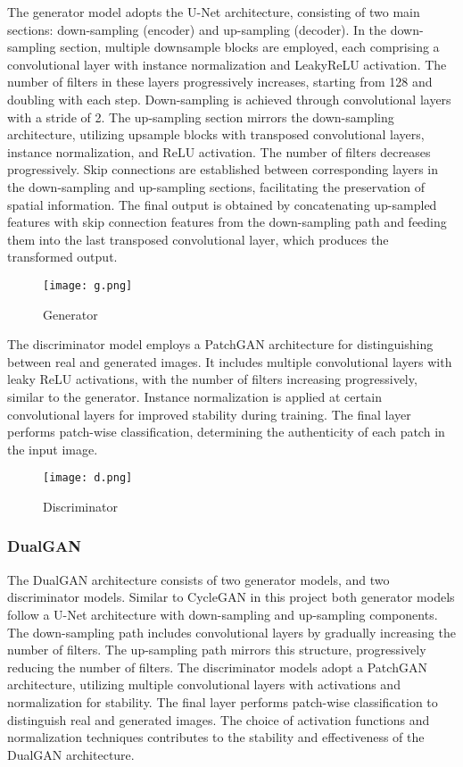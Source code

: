 \documentclass[conference]{IEEEtran}
\begin{document}
The generator model adopts the U-Net architecture, consisting of two main sections: down-sampling (encoder) and up-sampling (decoder). In the down-sampling section, multiple downsample blocks are employed, each comprising a convolutional layer with instance normalization and LeakyReLU activation. The number of filters in these layers progressively increases, starting from 128 and doubling with each step. Down-sampling is achieved through convolutional layers with a stride of 2. The up-sampling section mirrors the down-sampling architecture, utilizing upsample blocks with transposed convolutional layers, instance normalization, and ReLU activation. The number of filters decreases progressively. Skip connections are established between corresponding layers in the down-sampling and up-sampling sections, facilitating the preservation of spatial information. The final output is obtained by concatenating up-sampled features with skip connection features from the down-sampling path and feeding them into the last transposed convolutional layer, which produces the transformed output.

\begin{figure}[!ht]
  \centering
  \texttt{[image: g.png]}
  \captionsetup{justification=centering}
  \caption{Generator}
  \label{fig:Generator}
\end{figure}

The discriminator model employs a PatchGAN architecture for distinguishing between real and generated images. It includes multiple convolutional layers with leaky ReLU activations, with the number of filters increasing progressively, similar to the generator. Instance normalization is applied at certain convolutional layers for improved stability during training. The final layer performs patch-wise classification, determining the authenticity of each patch in the input image.

\begin{figure}[!ht]
  \centering
  \texttt{[image: d.png]}
  \captionsetup{justification=centering}
  \caption{Discriminator}
  \label{fig:Discriminator}
\end{figure}

\subsubsection{DualGAN}
The DualGAN architecture consists of two generator models, and two discriminator models. Similar to CycleGAN in this project both generator models follow a U-Net architecture with down-sampling and up-sampling components. The down-sampling path includes convolutional layers by gradually increasing the number of filters. The up-sampling path mirrors this structure, progressively reducing the number of filters. The discriminator models adopt a PatchGAN architecture, utilizing multiple convolutional layers with activations and normalization for stability. The final layer performs patch-wise classification to distinguish real and generated images. The choice of activation functions and normalization techniques contributes to the stability and effectiveness of the DualGAN architecture.
\end{document}
